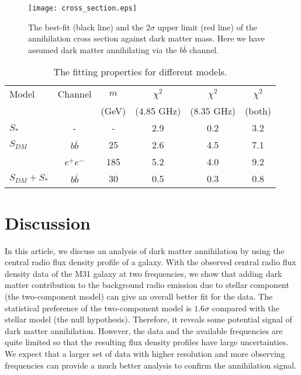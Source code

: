 \documentclass[useAMS,usenatbib]{mn2e}
\begin{document}
\begin{figure}
\vskip 10mm
 \texttt{[image: cross\_section.eps]}
 \caption{The best-fit (black line) and the 2$\sigma$ upper limit (red line) of the annihilation cross section against dark matter mass. Here we have assumed dark matter annihilating via the $b\bar{b}$ channel.}
\vskip 10mm
\end{figure}

\begin{table}
\caption{The fitting properties for different models.}
 \label{table2}
 \begin{tabular}{@{}lccccc}
  \hline
  Model & Channel &  $m$ & $\chi^2$ & $\chi^2$ & $\chi^2$ \\
        &         & (GeV) & (4.85 GHz) & (8.35 GHz) & (both) \\  
  \hline
  \hline
  $S_*$ & - & - & 2.9 & 0.2 & 3.2 \\
  \hline
  $S_{DM}$ & $b\bar{b}$ & 25 & 2.6 & 4.5 & 7.1 \\
   & $e^+e^-$ & 185 & 5.2 & 4.0 & 9.2 \\
  \hline
  $S_{DM}+S_*$ & $b\bar{b}$ & 30 & 0.5 & 0.3 & 0.8 \\
  \hline
 \end{tabular}
\end{table}

\section{Discussion}
In this article, we discuss an analysis of dark matter annihilation by using the central radio flux density profile of a galaxy. With the observed central radio flux density data of the M31 galaxy at two frequencies, we show that adding dark matter contribution to the background radio emission due to stellar component (the two-component model) can give an overall better fit for the data. The statistical preference of the two-component model is $1.6 \sigma$ compared with the stellar model (the null hypothesis). Therefore, it reveals some potential signal of dark matter annihilation. However, the data and the available frequencies are quite limited so that the resulting flux density profiles have large uncertainties. We expect that a larger set of data with higher resolution and more observing frequencies can provide a much better analysis to confirm the annihilation signal.
\end{document}
